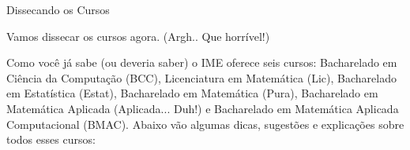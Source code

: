 \begin{secao}{Dissecando os Cursos}

Vamos dissecar os cursos agora. (Argh.. Que horrível!)

Como você já sabe (ou deveria saber) o IME oferece seis cursos: Bacharelado em
Ciência da Computação (BCC), Licenciatura em Matemática (Lic), Bacharelado em
Estatística (Estat), Bacharelado em Matemática (Pura), Bacharelado em
Matemática Aplicada (Aplicada... Duh!)  e Bacharelado em Matemática Aplicada
Computacional (BMAC). Abaixo vão algumas dicas, sugestões e explicações sobre
todos esses cursos:
















\end{secao}

